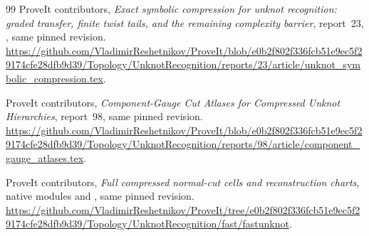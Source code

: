 \begin{thebibliography}{99}
ProveIt contributors,
\emph{Exact symbolic compression for unknot recognition:
graded transfer, finite twist tails, and the remaining complexity barrier},
report~23, , same pinned revision.
\url{https://github.com/VladimirReshetnikov/ProveIt/blob/e0b2f802f336fcb51e9ec5f29174cfe28dfb9d39/Topology/UnknotRecognition/reports/23/article/unknot_symbolic_compression.tex}.

ProveIt contributors,
\emph{Component-Gauge Cut Atlases for Compressed Unknot Hierarchies},
report~98, same pinned revision.
\url{https://github.com/VladimirReshetnikov/ProveIt/blob/e0b2f802f336fcb51e9ec5f29174cfe28dfb9d39/Topology/UnknotRecognition/reports/98/article/component_gauge_atlases.tex}.

ProveIt contributors,
\emph{Full compressed normal-cut cells and reconstruction charts},
native modules  and
, same pinned revision.
\url{https://github.com/VladimirReshetnikov/ProveIt/tree/e0b2f802f336fcb51e9ec5f29174cfe28dfb9d39/Topology/UnknotRecognition/fast/fastunknot}.

\end{thebibliography}
